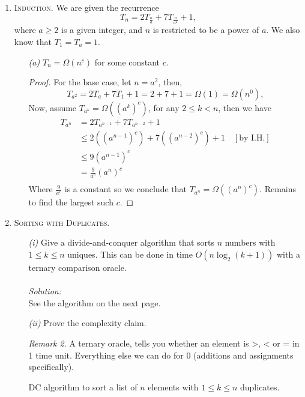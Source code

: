 \documentclass[12pt]{article}
\theoremstyle{definition}
\theoremstyle{remark}
\newtheorem*{remark}{Remark}
\newcommand\sol{%
  \\ 
  \\
  \textit{Solution:}\\%
}
\begin{document}
\begin{enumerate}
\begin{remark}
  \end{remark}
  \newpage  
  \item \textsc{Induction.} We are given the recurrence 
  $$T_n = 2 T_{\frac{n}{a}} + 7 T_{\frac{n}{a^2}} + 1,$$
  where $a \geq 2$ is a given integer, and $n$ is restricted to be a power of $a$. We also know that $T_1 = T_a = 1$.\newline
  \begin{enumerate}
    \item[\it (a)] $T_n = \Omega(n^c)$ for some constant $c.$
\begin{proof} For the base case, let $n = a^2$, then, 
  $$T_{a^2} = 2 T_a + 7T_1 + 1 = 2 + 7  + 1 = \Omega(1) = \Omega(n^0), $$
  Now, assume $T_{a^k} = \Omega ((a^k)^c)$, for any $2\leq k < n$, then we have 
  \begin{equation*}
    \begin{split}
      T_{a^n} &= 2 T_{a^{n-1}} + 7T_{a^{n-2}} + 1\\ 
      &\leq 2 ((a^{n-1})^c) + 7((a^{n-2})^c) + 1 \quad [\text{by I.H.}]\\ 
      & \leq 9 (a^{n-1})^c \\
      & = \frac{9}{a^c} \left( a^n\right)^c \\ 
    \end{split}
  \end{equation*}
  Where $\frac{9}{a^c} $ is a constant so we conclude that $T_{a^n} = \Omega ((a^n)^c)$. Remains to find the largest such $c.$ 
\end{proof}
  \end{enumerate}
  \newpage
  \item  \textsc{Sorting with Duplicates.} \begin{enumerate}
    \item[\it (i)] Give a divide-and-conquer algorithm that sorts $n$ numbers with $1\leq k\leq n$ uniques. This can be done in time $O(n \log_2(k + 1))$ with a ternary comparison oracle. 
    \sol See the algorithm on the next page.
   \item[\it (ii)] Prove the complexity claim.
\begin{remark} 
    A ternary oracle, tells you whether an element is >, < or = in 1 time unit. Everything else we can do for 0 (additions and assignments specifically).
\end{remark}
  \begin{algorithm}
    \caption{DC algorithm to sort a list of $n$ elements with $1\leq k\leq n$ duplicates. }
    \BlankLine
    \BlankLine


\end{algorithm}
\end{enumerate}
\end{enumerate}
\end{document}
